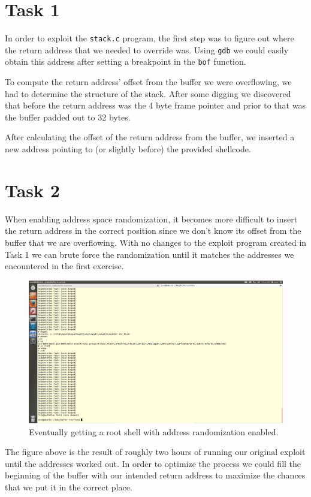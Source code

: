 \documentclass[12pt,letterpaper]{article}
\author{Chathan Driehuys}
\begin{document}
	\section*{Task 1}
		In order to exploit the \texttt{stack.c} program, the first step was to figure out where the return address that we needed to override was. Using \texttt{gdb} we could easily obtain this address after setting a breakpoint in the \texttt{bof} function.
		
		To compute the return address' offset from the buffer we were overflowing, we had to determine the structure of the stack. After some digging we discovered that before the return address was the 4 byte frame pointer and prior to that was the buffer padded out to 32 bytes.
		
		After calculating the offset of the return address from the buffer, we inserted a new address pointing to (or slightly before) the provided shellcode.
	
	\section*{Task 2}
		When enabling address space randomization, it becomes more difficult to insert the return address in the correct position since we don't know its offset from the buffer that we are overflowing. With no changes to the exploit program created in Task 1 we can brute force the randomization until it matches the addresses we encountered in the first exercise.
	
		\begin{figure}[h]
			\includegraphics[width=\linewidth]{task-2}
			\caption{Eventually getting a root shell with address randomization enabled.}
		\end{figure}
		
		The figure above is the result of roughly two hours of running our original exploit until the addresses worked out. In order to optimize the process we could fill the beginning of the buffer with our intended return address to maximize the chances that we put it in the correct place.
		
\end{document}
